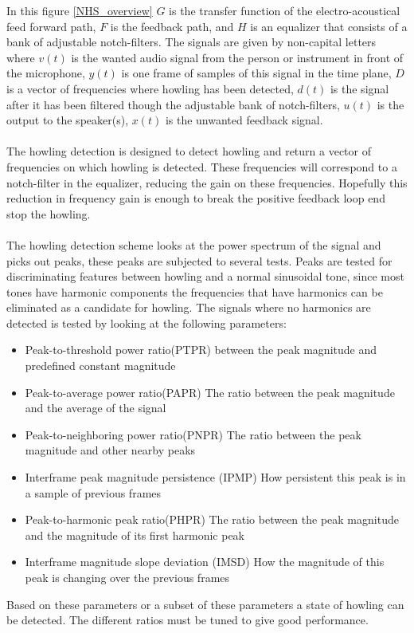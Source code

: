 In this figure \ref{NHS_overview} $G$ is the transfer function of the electro-acoustical feed forward path, $F$ is the feedback path, and $H$ is an equalizer that consists of a bank of adjustable notch-filters. The signals are given by non-capital letters where $v(t)$ is the wanted audio signal from the person or instrument in front of the microphone, $y(t)$ is one frame of samples of this signal in the time plane, $D$ is a vector of frequencies where howling has been detected, $d(t)$ is the signal after it has been filtered though the adjustable bank of notch-filters, $u(t)$ is the output to the speaker(s), $x(t)$ is the unwanted feedback signal.\\
\\
The howling detection is designed to detect howling and return a vector of frequencies on which howling is detected. These frequencies will correspond to a notch-filter in the equalizer, reducing the gain on these frequencies. Hopefully this reduction in frequency gain is enough to break the positive feedback loop end stop the howling. \\
\\
The howling detection scheme looks at the power spectrum of the signal and picks out peaks, these peaks are subjected to several tests. Peaks are tested for discriminating features between howling and a normal sinusoidal tone, since most tones have harmonic components the frequencies that have harmonics can be eliminated as a candidate for howling. The signals where no harmonics are detected is tested by looking at the following parameters:\\
\begin{itemize}
\item Peak-to-threshold power ratio(PTPR) 
\subitem between the peak magnitude and predefined constant magnitude
\item Peak-to-average power ratio(PAPR) 
\subitem The ratio between the peak magnitude and the average of the signal
\item Peak-to-neighboring power ratio(PNPR) 
\subitem The ratio between the peak magnitude and other nearby peaks
\item Interframe peak magnitude persistence (IPMP)
\subitem How persistent this peak is in a sample of previous frames

\item Peak-to-harmonic peak ratio(PHPR)
\subitem The ratio between the peak magnitude and the magnitude of its first harmonic peak
\item Interframe magnitude slope deviation (IMSD)
\subitem How the magnitude of this peak is changing over the previous frames
\end{itemize}
Based on these parameters or a subset of these parameters a state of howling can be detected. The different ratios must be tuned to give good performance.
